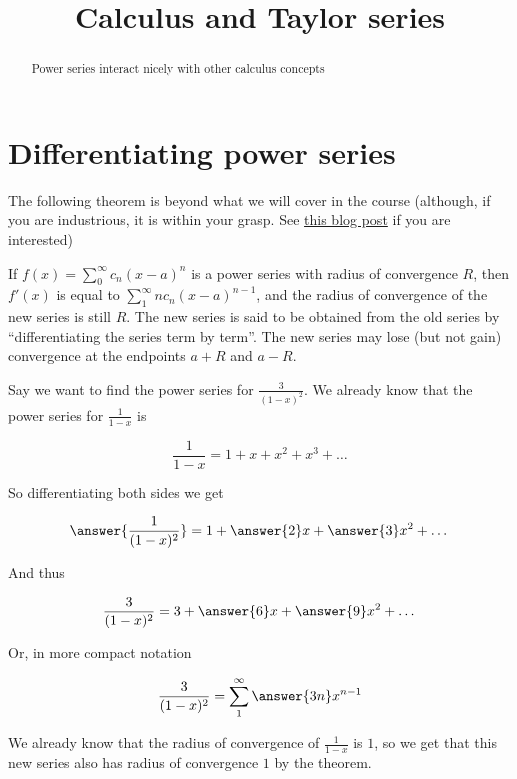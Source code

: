 \documentclass{ximera}
\title[Dig-In:]{Calculus and Taylor series}
\begin{document}
\begin{abstract}
  Power series interact nicely with other calculus concepts
\end{abstract}
\maketitle

\section{Differentiating power series}

The following theorem is beyond what we will cover in the course (although, if you are industrious, it is within your grasp.  See \href{https://gowers.wordpress.com/2014/02/22/differentiating-power-series/}{this blog post} if you are interested) 

\begin{theorem}
	If $f(x) = \sum_0^\infty c_n(x-a)^n$ is a power series with radius of convergence $R$, then $f'(x)$ is equal to  $\sum_1^\infty nc_n(x-a)^{n-1}$, and the radius of convergence of the new series is still $R$.  The new series is said to be obtained from the old series by ``differentiating the series term by term''.  The new series may lose (but not gain) convergence at the endpoints $a+R$ and $a-R$.
\end{theorem}

\begin{example}
	Say we want to find the power series for $\frac{3}{(1-x)^2}$.  We already know that the power series for $\frac{1}{1-x}$ is
	
	\[
	\frac{1}{1-x} = 1+x+x^2+x^3+\dots
	\]
	
	So differentiating both sides we get
	
	\[
	\answer{\frac{1}{(1-x)^2}} = 1+\answer{2}x+\answer{3}x^2+\dots
	\]
	
	And thus
	
	\[
	\frac{3}{(1-x)^2} = 3+\answer{6}x+\answer{9}x^2+\dots
	\]
	
	Or, in more compact notation
	
	\[
	\frac{3}{(1-x)^2} = \sum_1^\infty \answer{3n}x^{n-1}
	\]
	
	We already know that the radius of convergence of $\frac{1}{1-x}$ is $1$, so we get that this new series also has radius of convergence $1$ by the theorem.
\end{example}
\end{document}
